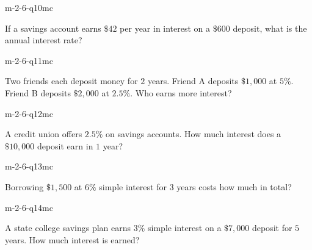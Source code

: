 \begin{practiceQuestion}{m-2-6-q10}{mc}
\begin{questionText}
If a savings account earns $\$42$ per year in interest on a $\$600$ deposit, what is the annual interest rate?
\end{questionText}
\end{practiceQuestion}

\begin{practiceQuestion}{m-2-6-q11}{mc}
\begin{questionText}
Two friends each deposit money for $2$ years. Friend A deposits $\$1{,}000$ at $5\%$. Friend B deposits $\$2{,}000$ at $2.5\%$. Who earns more interest?
\end{questionText}
\end{practiceQuestion}

\begin{practiceQuestion}{m-2-6-q12}{mc}
\begin{questionText}
A credit union offers $2.5\%$ on savings accounts. How much interest does a $\$10{,}000$ deposit earn in $1$ year?
\end{questionText}
\end{practiceQuestion}

\begin{practiceQuestion}{m-2-6-q13}{mc}
\begin{questionText}
Borrowing $\$1{,}500$ at $6\%$ simple interest for $3$ years costs how much in total?
\end{questionText}
\end{practiceQuestion}

\begin{practiceQuestion}{m-2-6-q14}{mc}
\begin{questionText}
A state college savings plan earns $3\%$ simple interest on a $\$7{,}000$ deposit for $5$ years. How much interest is earned?
\end{questionText}
\end{practiceQuestion}

